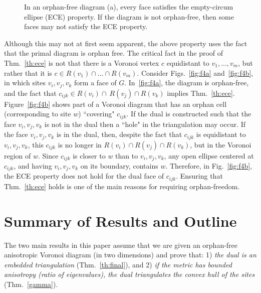 \documentclass[11pt]{article}
\begin{document}
\begin{figure}[ht]
\centering
{}
\label{fig:f4}
\caption{In an orphan-free diagram (a), every face  satisfies the
empty-circum ellipse (ECE) property. If the diagram is not orphan-free, then
some faces may not satisfy the ECE property.}
\end{figure}



Although this may not at first seem apparent,
the above property uses the fact that the primal diagram is orphan free. 
The critical fact in the proof of Thm.~\ref{th:ece} is not that
there is a Voronoi vertex $c$ equidistant to $v_1,\dots,v_m$, but rather that 
it is $c\in R(v_1)\cap\dots\cap R(v_m)$. 
Consider Figs.~\ref{fig:f4a} and~\ref{fig:f4b}, in which sites $v_i,v_j,v_k$ form a face of $G$. 
In~\ref{fig:f4a}, the diagram is orphan-free, and the fact that $c_{ijk}\in
R(v_i)\cap\ R(v_j)\cap R(v_k)$ implies Thm.~\ref{th:ece}. 
Figure~\ref{fig:f4b} shows part of a Voronoi diagram that has an orphan cell (corresponding
to site $w$) ``covering" $c_{ijk}$. 
If the dual is constructed such that the face $v_i,v_j,v_k$ is not in the dual  
then a ``hole" in the triangulation may occur. 
If the face $v_i,v_j,v_k$ is in the dual, 
then, 
despite the fact that $c_{ijk}$ is equidistant
to $v_i,v_j,v_k$, this $c_{ijk}$ is no longer in $R(v_i)\cap R(v_j)\cap R(v_k)$, but in the Voronoi region
of $w$. 
Since $c_{ijk}$ is closer to $w$ than to $v_i,v_j,v_k$, 
any open ellipse centered at $c_{ijk}$, and having
$v_i,v_j,v_k$ on its boundary, contains $w$.
Therefore, in Fig.~\ref{fig:f4b}, the ECE property does not hold for the dual
face of $c_{ijk}$.  
Ensuring that Thm.~\ref{th:ece} holds is one of the main reasons for requiring orphan-freedom. 






\section{Summary of Results and Outline}

The two main results in this paper assume that we are given an orphan-free anisotropic Voronoi diagram (in two dimensions) and 
prove that: 1) \emph{the dual is an embedded triangulation} (Thm.~\ref{th:final}), 
and 2) \emph{if the metric has bounded anisotropy (ratio of eigenvalues), the dual triangulates the convex hull of the sites} (Thm.~\ref{gamma}).
\end{document}
